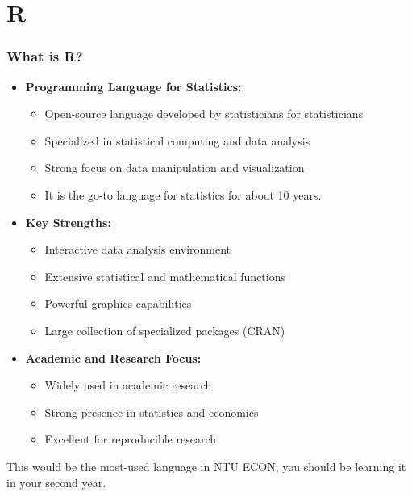 \documentclass[10pt]{beamer}
\begin{document}
\section{R}

\begin{frame}
    \frametitle{What is R?}
    \begin{itemize}
        \item \textbf{Programming Language for Statistics:}
            \begin{itemize}
                \item Open-source language developed by statisticians for statisticians
                \item Specialized in statistical computing and data analysis
                \item Strong focus on data manipulation and visualization
                \item It is the go-to language for statistics for about 10 years.
            \end{itemize}
        \item \textbf{Key Strengths:}
            \begin{itemize}
                \item Interactive data analysis environment
                \item Extensive statistical and mathematical functions
                \item Powerful graphics capabilities
                \item Large collection of specialized packages (CRAN)
            \end{itemize}
        \item \textbf{Academic and Research Focus:}
            \begin{itemize}
                \item Widely used in academic research
                \item Strong presence in statistics and economics
                \item Excellent for reproducible research
            \end{itemize}
    \end{itemize}
    This would be the most-used language in NTU ECON, you should be learning it in your second year.
\end{frame}
\end{document}
